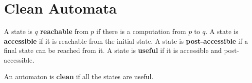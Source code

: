 \section{Clean Automata}

A state is $q$ \textbf{reachable} from $p$ if there is a computation from $p$ to $q$.
A state is \textbf{accessible} if it is reachable from the initial state.
A state is \textbf{post-accessible} if a final state can be reached from it.
A state is \textbf{useful} if it is accessible and post-accessible.

An automaton is \textbf{clean} if all the states are useful.
